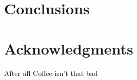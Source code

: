 \documentclass{sig-alternate}
\begin{document}
\section{Conclusions}

\section{Acknowledgments}

After all Coffee isn't that bad 

%

%
%
\end{document}
